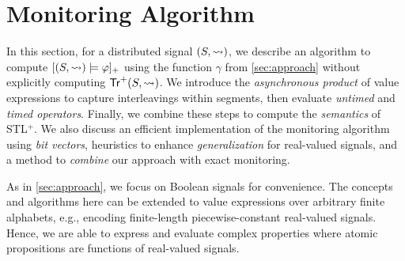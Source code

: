 \section{Monitoring Algorithm} 
\label{sec:algorithm}

In this section, for a distributed signal $(S,{\rightsquigarrow})$, we describe an algorithm to compute $[(S,{\rightsquigarrow}) \models \varphi]_+$ using the function $\gamma$ from \cref{sec:approach} without explicitly computing $\mathsf{Tr}^+(S,{\rightsquigarrow})$.
We introduce the \emph{asynchronous product} of value expressions to capture interleavings within segments, then evaluate \emph{untimed} and \emph{timed operators}.
Finally, we combine these steps to compute the \emph{semantics} of STL$^+$.
We also discuss an efficient implementation of the monitoring algorithm using \emph{bit vectors}, heuristics to enhance \emph{generalization} for real-valued signals, and a method to \emph{combine} our approach with exact monitoring.

\begin{remark}
	As in \cref{sec:approach}, we focus on Boolean signals for convenience.
	The concepts and algorithms here can be extended to value expressions over arbitrary finite alphabets, e.g., encoding finite-length piecewise-constant real-valued signals.
	Hence, we are able to express and evaluate complex properties where atomic propositions are functions of real-valued signals.
\end{remark}

